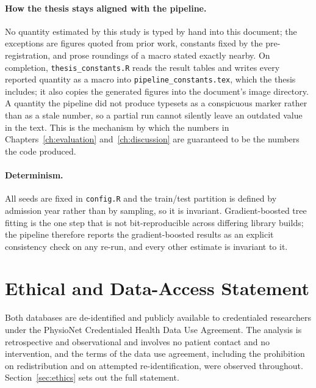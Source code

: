\paragraph{How the thesis stays aligned with the pipeline.} No quantity
estimated by this study is typed by hand into this document; the exceptions are
figures quoted from prior work, constants fixed by the pre-registration, and
prose roundings of a macro stated exactly nearby. On completion,
\texttt{thesis\_constants.R}
reads the result tables and writes every reported quantity as a macro into
\texttt{pipeline\_constants.tex}, which the thesis includes; it also copies the
generated figures into the document's image directory. A quantity the pipeline
did not produce typesets as a conspicuous marker rather than as a stale number,
so a partial run cannot silently leave an outdated value in the text. This is
the mechanism by which the numbers in Chapters~\ref{ch:evaluation}
and~\ref{ch:discussion} are guaranteed to be the numbers the code produced.

\paragraph{Determinism.} All seeds are fixed in \texttt{config.R} and the
train/test partition is defined by admission year rather than by sampling, so
it is invariant. Gradient-boosted tree fitting is the one step that is not
bit-reproducible across differing library builds; the pipeline therefore
reports the gradient-boosted results as an explicit consistency check on any
re-run, and every other estimate is invariant to it.

\section{Ethical and Data-Access Statement}

Both databases are de-identified and publicly available to credentialed
researchers under the PhysioNet Credentialed Health Data Use Agreement. The
analysis is retrospective and observational and involves no patient contact
and no intervention, and the terms of the data use agreement, including the
prohibition on redistribution and on attempted re-identification, were
observed throughout.
Section~\ref{sec:ethics} sets out the full statement.
